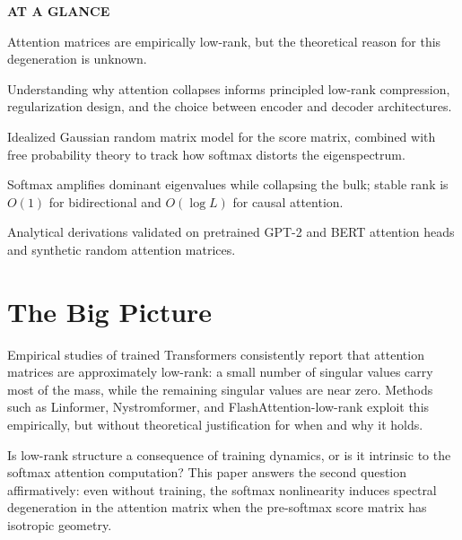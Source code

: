 \documentclass[10pt,twocolumn]{article}
\begin{document}
\begin{mdframed}[backgroundcolor=boxgray,linecolor=rulered,linewidth=1pt,
    innerleftmargin=6pt,innerrightmargin=6pt,
    innertopmargin=6pt,innerbottommargin=6pt]
\textbf{\small AT A GLANCE}\par\vspace{4pt}
\begin{description}[leftmargin=0pt,labelsep=4pt,itemsep=2pt,parsep=0pt,
    font=\small\bfseries]
  \item[Problem:] Attention matrices are empirically low-rank, but the
    theoretical reason for this degeneration is unknown.
  \item[Why it matters:] Understanding why attention collapses informs
    principled low-rank compression, regularization design, and the
    choice between encoder and decoder architectures.
  \item[Method:] Idealized Gaussian random matrix model for the score
    matrix, combined with free probability theory to track how softmax
    distorts the eigenspectrum.
  \item[Result:] Softmax amplifies dominant eigenvalues while collapsing
    the bulk; stable rank is $O(1)$ for bidirectional and $O(\log L)$ for
    causal attention.
  \item[Evidence:] Analytical derivations validated on pretrained GPT-2
    and BERT attention heads and synthetic random attention matrices.
\end{description}
\end{mdframed}

\section{The Big Picture}

Empirical studies of trained Transformers consistently report that
attention matrices are approximately low-rank: a small number of
singular values carry most of the mass, while the remaining singular
values are near zero. Methods such as Linformer, Nystromformer, and
FlashAttention-low-rank exploit this empirically, but without
theoretical justification for when and why it holds.

Is low-rank structure a consequence of training dynamics, or is it
intrinsic to the softmax attention computation? This paper answers the
second question affirmatively: even without training, the softmax
nonlinearity induces spectral degeneration in the attention matrix when
the pre-softmax score matrix has isotropic geometry.
\end{document}
